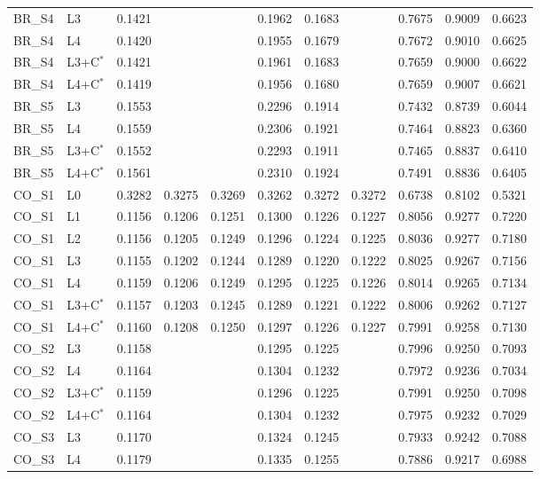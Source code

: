 \begin{tabular}{llrrrrrrrrr}
BR\_S4 & L3 & 0.1421 &  &  & 0.1962 & 0.1683 &  & 0.7675 & 0.9009 & 0.6623 \\
BR\_S4 & L4 & 0.1420 &  &  & 0.1955 & 0.1679 &  & 0.7672 & 0.9010 & 0.6625 \\
BR\_S4 & L3+C$^{*}$ & 0.1421 &  &  & 0.1961 & 0.1683 &  & 0.7659 & 0.9000 & 0.6622 \\
BR\_S4 & L4+C$^{*}$ & 0.1419 &  &  & 0.1956 & 0.1680 &  & 0.7659 & 0.9007 & 0.6621 \\
BR\_S5 & L3 & 0.1553 &  &  & 0.2296 & 0.1914 &  & 0.7432 & 0.8739 & 0.6044 \\
BR\_S5 & L4 & 0.1559 &  &  & 0.2306 & 0.1921 &  & 0.7464 & 0.8823 & 0.6360 \\
BR\_S5 & L3+C$^{*}$ & 0.1552 &  &  & 0.2293 & 0.1911 &  & 0.7465 & 0.8837 & 0.6410 \\
BR\_S5 & L4+C$^{*}$ & 0.1561 &  &  & 0.2310 & 0.1924 &  & 0.7491 & 0.8836 & 0.6405 \\
CO\_S1 & L0 & 0.3282 & 0.3275 & 0.3269 & 0.3262 & 0.3272 & 0.3272 & 0.6738 & 0.8102 & 0.5321 \\
CO\_S1 & L1 & 0.1156 & 0.1206 & 0.1251 & 0.1300 & 0.1226 & 0.1227 & 0.8056 & 0.9277 & 0.7220 \\
CO\_S1 & L2 & 0.1156 & 0.1205 & 0.1249 & 0.1296 & 0.1224 & 0.1225 & 0.8036 & 0.9277 & 0.7180 \\
CO\_S1 & L3 & 0.1155 & 0.1202 & 0.1244 & 0.1289 & 0.1220 & 0.1222 & 0.8025 & 0.9267 & 0.7156 \\
CO\_S1 & L4 & 0.1159 & 0.1206 & 0.1249 & 0.1295 & 0.1225 & 0.1226 & 0.8014 & 0.9265 & 0.7134 \\
CO\_S1 & L3+C$^{*}$ & 0.1157 & 0.1203 & 0.1245 & 0.1289 & 0.1221 & 0.1222 & 0.8006 & 0.9262 & 0.7127 \\
CO\_S1 & L4+C$^{*}$ & 0.1160 & 0.1208 & 0.1250 & 0.1297 & 0.1226 & 0.1227 & 0.7991 & 0.9258 & 0.7130 \\
CO\_S2 & L3 & 0.1158 &  &  & 0.1295 & 0.1225 &  & 0.7996 & 0.9250 & 0.7093 \\
CO\_S2 & L4 & 0.1164 &  &  & 0.1304 & 0.1232 &  & 0.7972 & 0.9236 & 0.7034 \\
CO\_S2 & L3+C$^{*}$ & 0.1159 &  &  & 0.1296 & 0.1225 &  & 0.7991 & 0.9250 & 0.7098 \\
CO\_S2 & L4+C$^{*}$ & 0.1164 &  &  & 0.1304 & 0.1232 &  & 0.7975 & 0.9232 & 0.7029 \\
CO\_S3 & L3 & 0.1170 &  &  & 0.1324 & 0.1245 &  & 0.7933 & 0.9242 & 0.7088 \\
CO\_S3 & L4 & 0.1179 &  &  & 0.1335 & 0.1255 &  & 0.7886 & 0.9217 & 0.6988 \\

\end{tabular}
